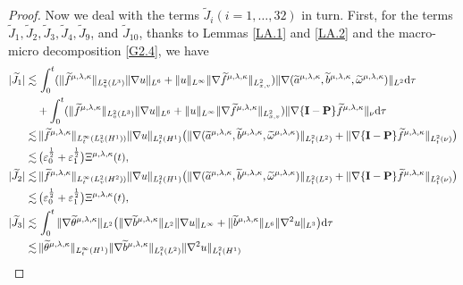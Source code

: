 \documentclass[reqno,11pt]{amsart}
\theoremstyle{plain}
\numberwithin{equation}{section}
\newcommand{\eps}{{\varepsilon}}
\begin{document}
\begin{proof}
Now we deal with  the terms $\widetilde{J}_i (i=1,\dots, 32)$ in turn. 
First, for the terms $\widetilde{J}_1, \widetilde{J}_2,\widetilde{J}_3,\widetilde{J}_4,\widetilde{J}_9$, 
and $\widetilde{J}_{10}$, 
thanks to Lemmas \ref{LA.1} and \ref{LA.2} and the macro-micro decomposition  \eqref{G2.4}, we have
\begin{align}
|\widetilde{J}_1|\lesssim&\,\int_0^t (\|\widetilde{f}^{\mu,\lambda,\kappa}\|_{L_v^2(L^3)}\|\nabla u\|_{L^6}+\|u\|_{L^\infty}\|\nabla\widetilde{f}^{\mu,\lambda,\kappa}\|_{L_{x,v}^2}) \|\nabla(\widetilde{a}^{\mu,\lambda,\kappa},\widetilde{b}^{\mu,\lambda,\kappa},\widetilde{\omega}^{\mu,\lambda,\kappa})\|_{L^2}  {\rm d}\tau  \nonumber\\
&+\int_0^t (\|\widetilde{f}^{\mu,\lambda,\kappa}\|_{L_v^2(L^3)}\|\nabla u\|_{L^6}+\|u\|_{L^\infty}\|\nabla\widetilde{f}^{\mu,\lambda,\kappa}\|_{L_{x,v}^2})  \|\nabla\{\mathbf{I}-\mathbf{P}\}\widetilde{f}^{\mu,\lambda,\kappa}\|_{\nu}  {\rm d}\tau  \nonumber\\
\lesssim&\,\|\widetilde{f}^{\mu,\lambda,\kappa}\|_{L_t^\infty(L_v^2(H^1))}\|\nabla u\|_{L_t^2(H^1)}\big(\|\nabla(\widetilde{a}^{\mu,\lambda,\kappa},\widetilde{b}^{\mu,\lambda,\kappa},\widetilde{\omega}^{\mu,\lambda,\kappa})\|_{L_t^2(L^2)}+\|\nabla\{\mathbf{I}-\mathbf{P}\}\widetilde{f}^{\mu,\lambda,\kappa}\|_{L_t^2(\nu)}\big)\nonumber\\
\lesssim&\, \big(\eps_0^\frac{1}{2}+\eps_1^\frac{1}{2}\big){\Xi} ^{\mu,\lambda,\kappa}(t),\label{G4.18}\\
|\widetilde{J}_2| 
\lesssim&\,\|\widetilde{f}^{\mu,\lambda,\kappa}\|_{L_t^\infty(L_v^2(H^2))}\|\nabla u\|_{L_t^2(H^1)}\big(\|\nabla(\widetilde{a}^{\mu,\lambda,\kappa},\widetilde{b}^{\mu,\lambda,\kappa},\widetilde{\omega}^{\mu,\lambda,\kappa})\|_{L_t^2(L^2)}+\|\nabla\{\mathbf{I}-\mathbf{P}\}\widetilde{f}^{\mu,\lambda,\kappa}\|_{L_t^2(\nu)}\big)\nonumber\\
\lesssim&\, \big(\eps_0^\frac{1}{2}+\eps_1^\frac{1}{2}\big){\Xi} ^{\mu,\lambda,\kappa}(t),\label{G4.18-1}\\
|\widetilde{J}_3|\lesssim&\,\int_0^t \|\nabla\widetilde{\theta}^{\mu,\lambda,\kappa}\|_{L^2}\big(\|\nabla \widetilde{b}^{\mu,\lambda,\kappa}\|_{L^2}\|\nabla u\|_{L^\infty}+\|\widetilde{b}^{\mu,\lambda,\kappa}\|_{L^6}\|\nabla^2 u\|_{L^3}\big){\rm d}\tau\nonumber\\
\lesssim&\, \|\widetilde{\theta}^{\mu,\lambda,\kappa}\|_{L_t^\infty(H^1)}\|\nabla\widetilde{b}^{\mu,\lambda,\kappa}\|_{L_t^2(L^2)}\|\nabla^2 u\|_{L_t^2(H^1)}\nonumber\\

\end{align}
\end{proof}
\end{document}
